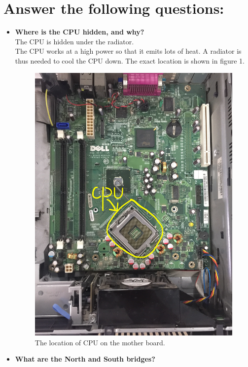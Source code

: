 \documentclass{article}
\begin{document}
\section{Answer the following questions:}
\begin{itemize}
	\item \textbf{Where is the CPU hidden, and why?}\\
	The CPU is hidden under the radiator.\\
	The CPU works at a high power so that it emits lots of heat. A radiator is thus needed to cool the CPU down.
	The exact location is shown in figure 1.
	\begin{figure}[h!]
	\begin{center}
	\includegraphics[scale=0.06]{CPU.jpg}
	\caption{The location of CPU on the mother board.}
	\end{center}
	\end{figure}
	\item \textbf{What are the North and South bridges?}\\

\end{itemize}
\end{document}
